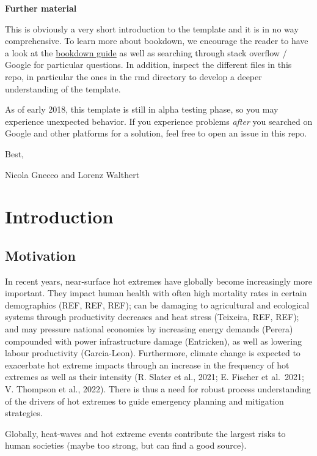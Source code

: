 \documentclass[11pt,a4paper,twoside,openright]{report}
\theoremstyle{definition}
\numberwithin{equation}{subsection}
\begin{document}
\textbf{Further material}

This is obviously a very short introduction to the template and it is in no way
comprehensive. To learn more about bookdown, we encourage the reader to have a
look at the \href{https://bookdown.org/yihui/bookdown/}{bookdown guide} as well as
searching through stack overflow / Google for particular questions. In addition,
inspect the different files in this repo, in particular the ones in the rmd
directory to develop a deeper understanding of the template.

As of early 2018, this template is still in alpha testing phase, so you may
experience unexpected behavior. If you experience problems
\emph{after} you searched on Google and other platforms for a solution, feel free to
open an issue in this repo.

Best,

Nicola Gnecco and Lorenz Walthert

\hypertarget{introduction}{%
\chapter{Introduction}\label{introduction}}

\hypertarget{motivation}{%
\section{Motivation}\label{motivation}}

In recent years, near-surface hot extremes have globally become increasingly more important. They impact human health with often high mortality rates in certain demographics (REF, REF, REF); can be damaging to agricultural and ecological systems through productivity decreases and heat stress (Teixeira, REF, REF); and may pressure national economies by increasing energy demands (Perera) compounded with power infrastructure damage (Entricken), as well as lowering labour productivity (Garcia-Leon). Furthermore, climate change is expected to exacerbate hot extreme impacts through an increase in the frequency of hot extremes as well as their intensity (R. Slater et al., 2021; E. Fischer et al.~2021; V. Thompson et al., 2022). There is thus a need for robust process understanding of the drivers of hot extremes to guide emergency planning and mitigation strategies.

Globally, heat-waves and hot extreme events contribute the largest risks to human societies (maybe too strong, but can find a good source).
\end{document}

